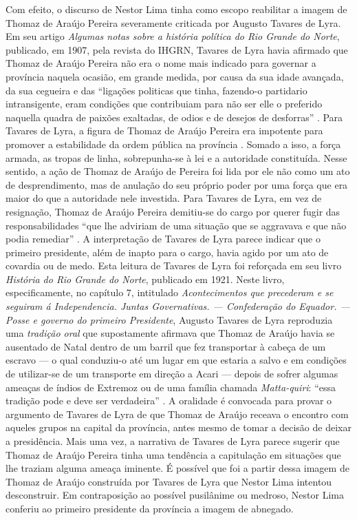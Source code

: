 \begin{refsection}
    Com efeito, o discurso de Nestor Lima tinha como escopo reabilitar a imagem de Thomaz de Araújo Pereira severamente criticada por Augusto Tavares de Lyra. Em seu artigo \textit{Algumas notas sobre a história política do Rio Grande do Norte}, publicado, em 1907, pela revista do IHGRN, Tavares de Lyra havia afirmado que Thomaz de Araújo Pereira não era o nome mais indicado para governar a província naquela ocasião, em grande medida, por causa da sua idade avançada, da sua cegueira e das ``ligações politicas que tinha, fazendo-o partidario intransigente, eram condições que contribuiam para não ser elle o preferido naquella quadra de paixões exaltadas, de odios e de desejos de desforras'' \cite[p.~240]{Lyra1907Notas}. Para Tavares de Lyra, a figura de Thomaz de Araújo Pereira era impotente para promover a estabilidade da ordem pública na província \cite[p.~240]{Lyra1907Notas}. Somado a isso, a força armada, as tropas de linha, sobrepunha-se à lei e a autoridade constituída. Nesse sentido, a ação de Thomaz de Araújo de Pereira foi lida por ele não como um ato de desprendimento, mas de anulação do seu próprio poder por uma força que era maior do que a autoridade nele investida. Para Tavares de Lyra, em vez de resignação, Thomaz de Araújo Pereira demitiu-se do cargo por querer fugir das responsabilidades ``que lhe adviriam de uma situação que se aggravava e que não podia remediar'' \cite[p.~240]{Lyra1907Notas}. A interpretação de Tavares de Lyra parece indicar que o primeiro presidente, além de inapto para o cargo, havia agido por um ato de covardia ou de medo. Esta leitura de Tavares de Lyra foi reforçada em seu livro \textit{História do Rio Grande do Norte}, publicado em 1921. Neste livro, especificamente, no capítulo 7, intitulado \textit{Acontecimentos que precederam e se seguiram á Independencia. Juntas Governativas. --- Confederação do Equador. --- Posse e governo do primeiro Presidente}, Augusto Tavares de Lyra reproduzia uma \textit{tradição oral} que supostamente afirmava que Thomaz de Araújo havia se ausentado de Natal dentro de um barril que fez transportar à cabeça de um escravo --- o qual conduziu-o até um lugar em que estaria a salvo e em condições de utilizar-se de um transporte em direção a Acari --- depois de sofrer algumas ameaças de índios de Extremoz ou de uma família chamada \textit{Matta-quiri}: ``essa tradição pode e deve ser verdadeira'' \cite[p.~533]{Lyra1921Historia}. A oralidade é convocada para provar o argumento de Tavares de Lyra de que Thomaz de Araújo receava o encontro com aqueles grupos na capital da província, antes mesmo de tomar a decisão de deixar a presidência. Mais uma vez, a narrativa de Tavares de Lyra parece sugerir que Thomaz de Araújo Pereira tinha uma tendência a capitulação em situações que lhe traziam alguma ameaça iminente. É possível que foi a partir dessa imagem de Thomaz de Araújo construída por Tavares de Lyra que Nestor Lima intentou desconstruir. Em contraposição ao possível pusilânime ou medroso, Nestor Lima conferiu ao primeiro presidente da província a imagem de abnegado. 


\end{refsection}
